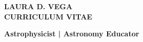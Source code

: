 \documentclass[12pt]{article}
\begin{document}
\pagestyle{fancy}
\fancyhf{}
\renewcommand{\headrulewidth}{0pt}

\newcommand{\CVsubsection}[1]{%
  \vspace{3mm}%
  \noindent{\bf #1}\\[-3mm]
}


\begin{center} 
\bfseries{
\LARGE \uppercase{Laura D. Vega} \\
\large \uppercase{Curriculum Vitae}}
\end{center}

\noindent
\begin{center}{\bf Astrophysicist | Astronomy Educator} \\
\end{center}
\end{document}
